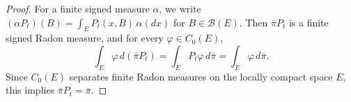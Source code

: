 \documentclass[aihp]{imsart}
\numberwithin{equation}{section}
\theoremstyle{plain}
\newtheorem{proposition}[proposition]{Proposition}
\newtheorem{lemma}[lemma]{Lemma}
\theoremstyle{definition}
\newcommand{\R}{\mathbb R}
\newcommand{\1}{\mathbf 1}
\begin{document}
\begin{proof}
        For a finite
signed measure \(\alpha\), we write $(\alpha P_t)(B)
        =
        \int_E P_t(x,B)\,\alpha(dx)$ for  $B\in\mathcal B(E).$ Then \(\bar\pi P_t\) is a finite signed Radon measure, and for every
\(\varphi\in C_0(E)\),
\[
        \int_E \varphi\,d(\bar\pi P_t)
        =
        \int_E P_t\varphi\,d\bar\pi
        =
        \int_E \varphi\,d\bar\pi .
\]
Since \(C_0(E)\) separates finite Radon measures on the locally compact space \(E\), this
implies $\bar\pi P_t=\bar\pi.$
\end{proof}

\end{document}
